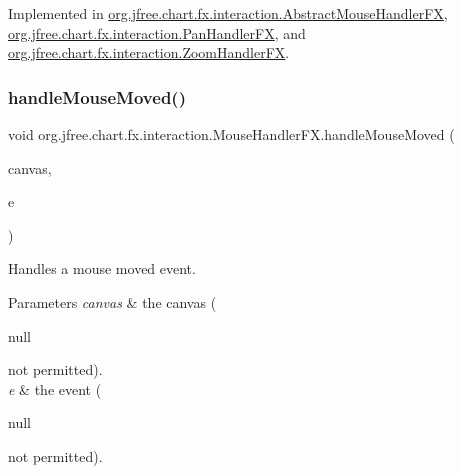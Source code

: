 Implemented in \mbox{\hyperlink{classorg_1_1jfree_1_1chart_1_1fx_1_1interaction_1_1_abstract_mouse_handler_f_x_a467c9af78e00bda4799b151328d84c9e}{org.\+jfree.\+chart.\+fx.\+interaction.\+Abstract\+Mouse\+Handler\+FX}}, \mbox{\hyperlink{classorg_1_1jfree_1_1chart_1_1fx_1_1interaction_1_1_pan_handler_f_x_a2b6a12e23c42bf9e000720a3637fa417}{org.\+jfree.\+chart.\+fx.\+interaction.\+Pan\+Handler\+FX}}, and \mbox{\hyperlink{classorg_1_1jfree_1_1chart_1_1fx_1_1interaction_1_1_zoom_handler_f_x_a42e60db6b183e94f2997e79647bb5403}{org.\+jfree.\+chart.\+fx.\+interaction.\+Zoom\+Handler\+FX}}.

\mbox{\label{interfaceorg_1_1jfree_1_1chart_1_1fx_1_1interaction_1_1_mouse_handler_f_x_a71fb6066ff587b62484100705777fc19}} 
\subsubsection{\texorpdfstring{handle\+Mouse\+Moved()}{handleMouseMoved()}}
{\footnotesize\ttfamily void org.\+jfree.\+chart.\+fx.\+interaction.\+Mouse\+Handler\+F\+X.\+handle\+Mouse\+Moved (\begin{DoxyParamCaption}\item[{\mbox{\hyperlink{classorg_1_1jfree_1_1chart_1_1fx_1_1_chart_canvas}{Chart\+Canvas}}}]{canvas,  }\item[{Mouse\+Event}]{e }\end{DoxyParamCaption})}

Handles a mouse moved event.


\begin{DoxyParams}{Parameters}
{\em canvas} & the canvas (
\begin{DoxyCode}
null 
\end{DoxyCode}
 not permitted). \\
\hline
{\em e} & the event (
\begin{DoxyCode}
null 
\end{DoxyCode}
 not permitted). \\
\hline
\end{DoxyParams}



